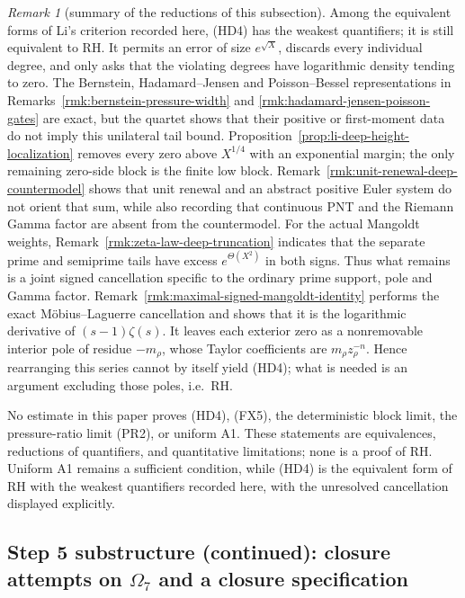 \documentclass[11pt]{amsart}
\theoremstyle{definition}
\theoremstyle{remark}
\newtheorem{remark}[theorem]{Remark}
\theoremstyle{definition}
\begin{document}
\begin{remark}[summary of the reductions of this subsection]
Among the equivalent forms of Li's criterion recorded here, (HD4) has the
weakest quantifiers; it is still equivalent to RH.  It permits an error of size $e^{\sqrt X}$, discards every
individual degree, and only asks that the violating degrees have logarithmic
density tending to zero.  The Bernstein, Hadamard--Jensen and Poisson--Bessel
representations in Remarks~\ref{rmk:bernstein-pressure-width} and
\ref{rmk:hadamard-jensen-poisson-gates} are exact, but the quartet shows that
their positive or first-moment data do not imply this unilateral tail bound.
Proposition~\ref{prop:li-deep-height-localization} removes every zero above
$X^{1/4}$ with an exponential margin; the only remaining zero-side block is
the finite low block.  Remark~\ref{rmk:unit-renewal-deep-countermodel}
shows that unit renewal and an abstract positive Euler system do not orient
that sum, while also recording that continuous PNT and the Riemann Gamma
factor are absent from the countermodel.  For the actual Mangoldt weights,
Remark~\ref{rmk:zeta-law-deep-truncation} indicates that the separate prime and
semiprime tails have excess $e^{\Theta(X^2)}$ in both signs.  Thus what remains is a joint signed cancellation specific to the
ordinary prime support, pole and Gamma factor.
Remark~\ref{rmk:maximal-signed-mangoldt-identity} performs the exact
Möbius--Laguerre cancellation and shows that it is the logarithmic derivative
of $(s-1)\zeta(s)$.  It leaves each exterior zero as a nonremovable interior
pole of residue $-m_\rho$, whose Taylor coefficients are
$m_\rho z_\rho^{-n}$.  Hence rearranging this series cannot by itself yield (HD4); what is needed
is an argument excluding those poles, i.e.\ RH.

No estimate in this paper proves (HD4), (FX5), the deterministic block
limit, the pressure-ratio limit (PR2), or uniform A1.  These statements are
equivalences, reductions of quantifiers, and quantitative limitations; none
is a proof of RH.  Uniform A1 remains a sufficient condition, while (HD4) is
the equivalent form of RH with the weakest quantifiers recorded here, with
the unresolved cancellation displayed explicitly.
\end{remark}


\subsection{Step 5 substructure (continued): closure attempts on \texorpdfstring{$\Omega_7$}{Omega7} and a closure specification}\label{subsec:omega7-attack}
\end{document}
